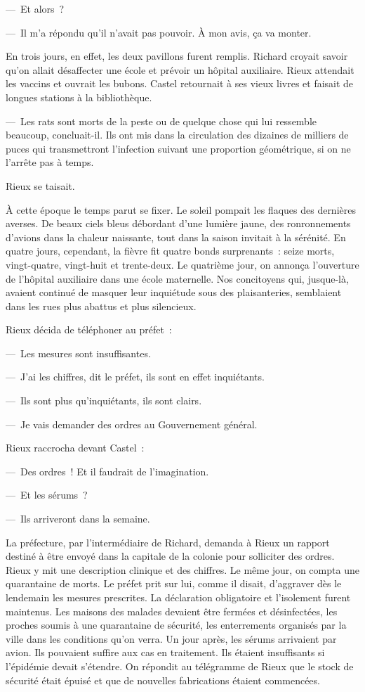 \documentclass[french,twoside]{book} %
\begin{document}
— Et alors ?\par
— Il m’a répondu qu’il n’avait pas pouvoir. À mon avis, ça va monter.\par
En trois jours, en effet, les deux pavillons furent remplis. Richard croyait savoir qu’on allait désaffecter une école et prévoir un hôpital auxiliaire. Rieux attendait les vaccins et ouvrait les bubons. Castel retournait à ses vieux livres et faisait de longues stations à la bibliothèque.\par
— Les rats sont morts de la peste ou de quelque chose qui lui ressemble beaucoup, concluait-il. Ils ont mis dans la circulation des dizaines de milliers de puces qui transmettront l’infection suivant une proportion géométrique, si on ne l’arrête pas à temps.\par
Rieux se taisait.\par
À cette époque le temps parut se fixer. Le soleil pompait les flaques des dernières averses. De beaux ciels bleus débordant d’une lumière jaune, des ronronnements d’avions dans la chaleur naissante, tout dans la saison invitait à la sérénité. En quatre jours, cependant, la fièvre fit quatre bonds surprenants : seize morts, vingt-quatre, vingt-huit et trente-deux. Le quatrième jour, on annonça l’ouverture de l’hôpital auxiliaire dans une école maternelle. Nos concitoyens qui, jusque-là, avaient continué de masquer leur inquiétude sous des plaisanteries, semblaient dans les rues plus abattus et plus silencieux.\par
Rieux décida de téléphoner au préfet :\par
— Les mesures sont insuffisantes.\par
— J’ai les chiffres, dit le préfet, ils sont en effet inquiétants.\par
— Ils sont plus qu’inquiétants, ils sont clairs.\par
— Je vais demander des ordres au Gouvernement général.\par
Rieux raccrocha devant Castel :\par
— Des ordres ! Et il faudrait de l’imagination.\par
— Et les sérums ?\par
— Ils arriveront dans la semaine.\par
La préfecture, par l’intermédiaire de Richard, demanda à Rieux un rapport destiné à être envoyé dans la capitale de la colonie pour solliciter des ordres. Rieux y mit une description clinique et des chiffres. Le même jour, on compta une quarantaine de morts. Le préfet prit sur lui, comme il disait, d’aggraver dès le lendemain les mesures prescrites. La déclaration obligatoire et l’isolement furent maintenus. Les maisons des malades devaient être fermées et désinfectées, les proches soumis à une quarantaine de sécurité, les enterrements organisés par la ville dans les conditions qu’on verra. Un jour après, les sérums arrivaient par avion. Ils pouvaient suffire aux cas en traitement. Ils étaient insuffisants si l’épidémie devait s’étendre. On répondit au télégramme de Rieux que le stock de sécurité était épuisé et que de nouvelles fabrications étaient commencées.\par
\end{document}
